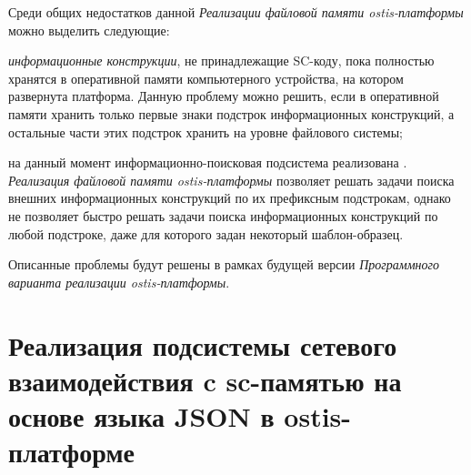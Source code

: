 Среди общих недостатков данной \textit{Реализации файловой памяти ostis-платформы} можно выделить следующие:
\begin{textitemize}
    \item \textit{информационные конструкции}, не принадлежащие SC-коду, пока полностью хранятся в оперативной памяти компьютерного устройства, на котором развернута платформа. Данную проблему можно решить, если в оперативной памяти хранить только первые знаки подстрок информационных конструкций, а остальные части этих подстрок хранить на уровне файлового системы;
    \item на данный момент информационно-поисковая подсистема реализована . \textit{Реализация файловой памяти ostis-платформы} позволяет  решать задачи поиска внешних информационных конструкций по их префиксным подстрокам, однако не позволяет быстро решать задачи поиска информационных конструкций по любой подстроке, даже для которого задан некоторый шаблон-образец.
\end{textitemize}

Описанные проблемы будут решены в рамках будущей версии \textit{Программного варианта реализации ostis-платформы}.

\section{Реализация подсистемы сетевого взаимодействия c sc-памятью на основе языка JSON в ostis-платформе}
\label{sec_soft_platform_sc_server_subsystem}

